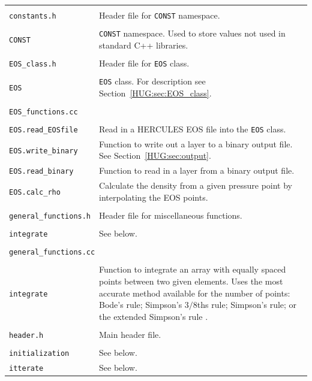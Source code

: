 \documentclass[11pt, oneside]{article}   	%
\begin{document}
\begin{longtable}{l p{10cm}}
\multicolumn{2}{l}{} \\
\texttt{constants.h} & Header file for \texttt{CONST} namespace. \\
\hline \\
\texttt{CONST} & \texttt{CONST} namespace. Used to store values not used in standard C++ libraries. \\

\multicolumn{2}{l}{} \\
\texttt{EOS\_class.h} & Header file for \texttt{EOS} class. \\
\hline \\
\texttt{EOS} & \texttt{EOS} class. For description see Section~\ref{HUG:sec:EOS_class}. \\

\multicolumn{2}{l}{} \\
\multicolumn{2}{l}{\texttt{EOS\_functions.cc}} \\
\hline \\
\texttt{EOS.read\_EOSfile} & Read in a HERCULES EOS file into the \texttt{EOS} class. \\
\texttt{EOS.write\_binary} & Function to write out a layer to a binary output file. See Section~\ref{HUG:sec:output}. \\
\texttt{EOS.read\_binary} & Function to read in a layer from a binary output file. \\
\texttt{EOS.calc\_rho} & Calculate the density from a given pressure point by interpolating the EOS points. \\

\multicolumn{2}{l}{} \\
\texttt{general\_functions.h} & Header file for miscellaneous functions. \\
\hline \\
\texttt{integrate} & See below. \\

\multicolumn{2}{l}{} \\
\multicolumn{2}{l}{\texttt{general\_functions.cc}} \\
\hline \\
\texttt{integrate} & Function to integrate an array with equally spaced points between two given elements. Uses the most accurate method available for the number of points: Bode's rule; Simpson's $3/8$ths rule; Simpson's rule; or the extended Simpson's rule \citep{Ziegel2007}. \\

\multicolumn{2}{l}{} \\
\texttt{header.h} & Main header file. \\
\hline \\
\texttt{initialization} & See below. \\
\texttt{itterate} & See below. \\


\end{longtable}
\end{document}
